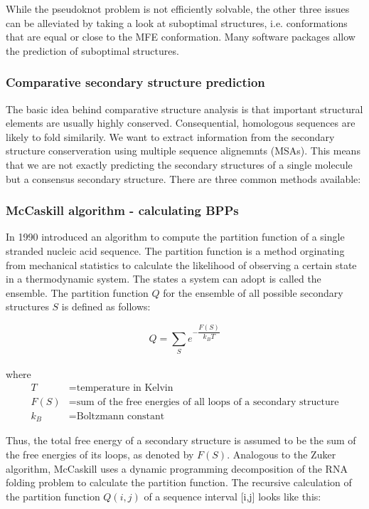 While the pseudoknot problem is not efficiently solvable, the other three issues can be alleviated by taking a look at suboptimal structures, i.e. conformations that are equal or close to the MFE conformation. Many software packages allow the prediction of suboptimal structures. 

 
\subsubsection{Comparative secondary structure prediction}
The basic idea behind comparative structure analysis is that important structural elements are usually highly conserved. Consequential, homologous sequences are likely to fold similarily. We want to extract information from the secondary structure conserveration using multiple sequence alignemnts (MSAs). This means that we are not exactly predicting the secondary structures of a single molecule but a consensus secondary structure. There are three common methods available: 


\subsubsection{McCaskill algorithm - calculating BPPs}
In 1990 \citeauthor{pmid1695107} introduced an algorithm to compute the partition function of a single stranded nucleic acid sequence. The partition function is a method orginating from  mechanical statistics to calculate the likelihood of observing a certain state in a thermodynamic system. The states a system can adopt is called the ensemble. The partition function $Q$ for the ensemble of all possible secondary structures $S$ is defined as follows\citep{pmid1695107}:  

\begin{equation*}
	Q = \sum_{S} e^{-\dfrac{F(S)}{k_BT}}
\end{equation*} \\
where
\begin{equation*}
  \begin{aligned}
	T &= \text{temperature in Kelvin} \\
	F(S) &= \text{sum of the free energies of all loops of a secondary structure} \\
	k_B &= \text{Boltzmann constant}
  \end{aligned}
\end{equation*}

Thus, the total free energy of a secondary structure is assumed to be the sum of the free energies of its loops, as denoted by $F(S)$.  Analogous to the Zuker algorithm, McCaskill uses a dynamic programming decomposition of the RNA folding problem to calculate the partition function. The recursive calculation of the partition function $Q(i,j)$ of a sequence interval [i,j] looks like this\citep{pmid21388531}:

